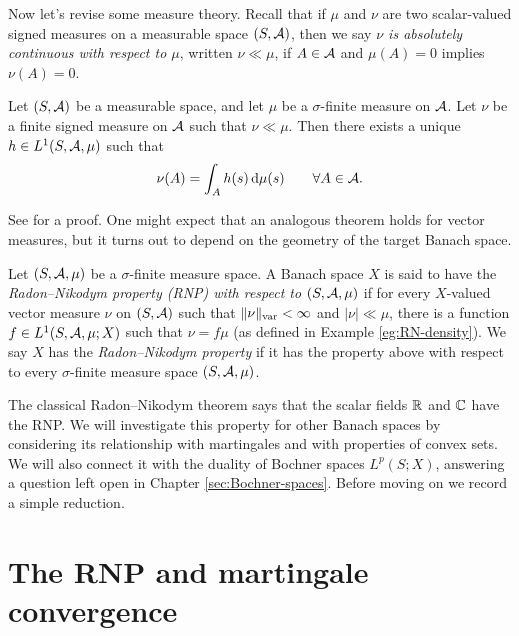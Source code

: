 Now let's revise some measure theory.
Recall that if $\mu$ and $\nu$ are two scalar-valued signed measures on a measurable space $(S,\mathcal{A})$, then we say \emph{$\nu$ is absolutely continuous with respect to $\mu$}, written $\nu \ll \mu$, if $A \in \mathcal{A}$ and $\mu(A) = 0$ implies $\nu(A) = 0$.

\begin{thm}
  Let $(S,\mathcal{A})$ be a measurable space, and let $\mu$ be a $\sigma$-finite measure on $\mathcal{A}$.
  Let $\nu$ be a finite signed measure on $\mathcal{A}$ such that $\nu \ll \mu$.
  Then there exists a unique $h \in L^1(S,\mathcal{A},\mu)$ such that
  \begin{equation*}
    \nu(A) = \int_{A} h(s) \, \mathrm{d}\mu(s) \qquad \forall A \in \mathcal{A}.
  \end{equation*}
\end{thm}

See \cite[Theorem 5.5.4]{rD04} for a proof.
One might expect that an analogous theorem holds for vector measures, but it turns out to depend on the geometry of the target Banach space.

\begin{defn}
  Let $(S,\mathcal{A},\mu)$ be a $\sigma$-finite measure space.
  A Banach space $X$ is said to have the \emph{Radon--Nikodym property (RNP) with respect to $(S,\mathcal{A},\mu)$} if for every $X$-valued vector measure $\nu$ on $(S,\mathcal{A})$ such that $\|\nu\|_{\mathrm{var}} < \infty$ and $|\nu| \ll \mu$, there is a function $f \in L^1(S,\mathcal{A},\mu;X)$ such that $\nu = f\mu$ (as defined in Example \ref{eg:RN-density}).
  We say $X$ has the \emph{Radon--Nikodym property} if it has the property above with respect to every $\sigma$-finite measure space $(S,\mathcal{A},\mu)$.
\end{defn}

The classical Radon--Nikodym theorem says that the scalar fields $\mathbb{R}$ and $\mathbb{C}$ have the RNP.
We will investigate this property for other Banach spaces by considering its relationship with martingales and with properties of convex sets.
We will also connect it with the duality of Bochner spaces $L^p(S;X)$, answering a question left open in Chapter \ref{sec:Bochner-spaces}.
Before moving on we record a simple reduction.

\begin{prop}\label{prop:RNP-finite-sufficient}
\end{prop}

\section{The RNP and martingale convergence}

